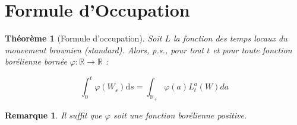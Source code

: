 \documentclass[openany]{book}
\newcommand{\R}{\mathbb{R}}
\newcommand{\1}{\mathbbm{1}}
\renewcommand{\d}{\mathrm{d}}
\theoremstyle{thmfont}
\newtheorem{theorem}{Théorème}[chapter]
\theoremstyle{deffont}
\theoremstyle{thmfont}
\theoremstyle{deffont}
\newtheorem{remark}[remark]{Remarque}
\begin{document}

\section{Formule d'Occupation}

\begin{theorem}[Formule d'occupation]
\label{thm:occupation} Soit $L$ la fonction des temps locaux du mouvement brownien (standard). Alors, p.s., pour tout $t$ et pour toute fonction borélienne bornée $\varphi : \R \rightarrow \R$ :

\begin{equation}
  \int_0^t \varphi(W_s) \d s = \int_{\R_+}\varphi(a)L_t^a(W)da
  \label{eq:occupation}
\end{equation}

\end{theorem}

\begin{remark}
  Il suffit que $\varphi$ soit une fonction borélienne positive.
  \end{remark}
\end{document}
